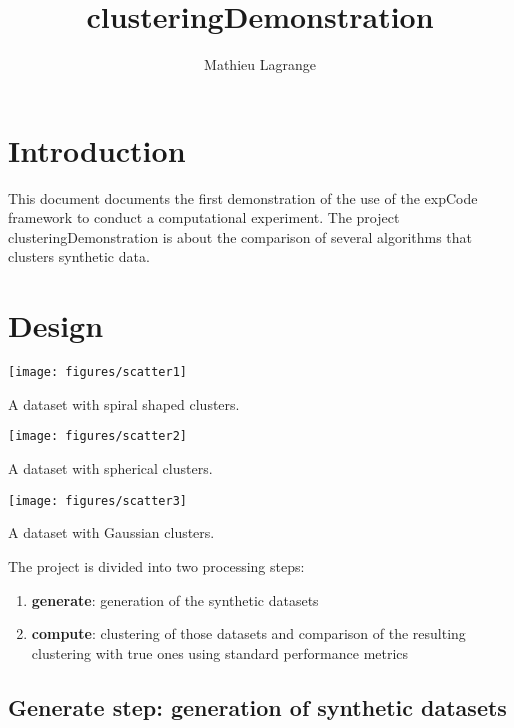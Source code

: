 \documentclass[12pt,a4paper,fleqn]{tufte-handout}
\title[clustering]{clusteringDemonstration}
\author{ Mathieu Lagrange }
\begin{document}
 
  
\maketitle 
  
\section{Introduction}


This document documents the first demonstration of the use of the expCode framework to conduct a computational experiment. The project clusteringDemonstration is about the comparison of several algorithms that clusters synthetic data.

\section{Design}

\begin{marginfigure}
\texttt{[image: figures/scatter1]}
\caption{A dataset with spiral shaped clusters.}
\label{scatter}
\end{marginfigure}

\begin{marginfigure}
\texttt{[image: figures/scatter2]}
\caption{A dataset with spherical clusters.}
\label{scatter}
\end{marginfigure}

\begin{marginfigure}
\texttt{[image: figures/scatter3]}
\caption{A dataset with Gaussian clusters.}
\label{scatter}
\end{marginfigure}

 The project is divided into two processing steps:
\begin{enumerate}
\item \textbf{generate}: generation of the synthetic datasets
\item \textbf{compute}: clustering of those datasets and comparison of the resulting clustering with true ones using standard performance metrics
\end{enumerate}

\subsection{\textbf{Generate step}: generation of synthetic datasets}
\end{document}
